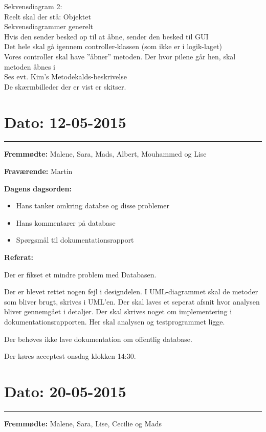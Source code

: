 Sekvensdiagram 2:\\
	Reelt skal der stå: Objektet
\\
Sekvensdiagrammer generelt\\
	Hvis den sender besked op til at åbne, sender den besked til GUI\\
	Det hele skal gå igennem controller-klassen (som ikke er i logik-laget)
\\

Vores controller skal have ”åbner” metoden.
Der hvor pilene går hen, skal metoden åbnes i\\
Ses evt. Kim’s Metodekalds-beskrivelse
\\

De skærmbilleder der er vist er skitser.


\section{Dato: 12-05-2015}
\hrule


\textbf{Fremmødte:} Malene, Sara, Mads, Albert, Mouhammed og Lise 

\textbf{Fraværende:} Martin

\textbf{Dagens dagsorden:}
\begin{itemize}
	\item Hans tanker omkring databse og disse problemer
	\item Hans kommentarer på database
	\item Spørgsmål til dokumentationsrapport
\end{itemize}

\textbf{Referat:}

Der er fikset et mindre problem med Databasen. 

Der er blevet rettet nogen fejl i designdelen. I UML-diagrammet skal de metoder som bliver brugt, skrives i UML'en. Der skal laves et seperat afsnit hvor analysen bliver gennemgået i detaljer. Der skal skrives noget om implementering i dokumentationsrapporten. Her skal analysen og testprogrammet ligge. 

Der behøves ikke lave dokumentation om offentlig database. 

Der køres acceptest onsdag klokken 14:30. 

\section{Dato: 20-05-2015}
\hrule

\textbf{Fremmødte: } Malene, Sara, Lise, Cecilie og Mads

